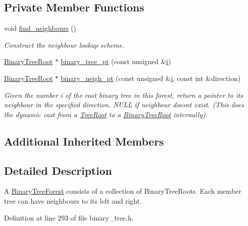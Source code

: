\subsection*{Private Member Functions}
\begin{DoxyCompactItemize}
\item 
void \hyperlink{classoomph_1_1BinaryTreeForest_a01845fafe6ef29f11226bf11e07eec1a}{find\+\_\+neighbours} ()
\begin{DoxyCompactList}\small\item\em Construct the neighbour lookup scheme. \end{DoxyCompactList}\item 
\hyperlink{classoomph_1_1BinaryTreeRoot}{Binary\+Tree\+Root} $\ast$ \hyperlink{classoomph_1_1BinaryTreeForest_a21c3136cc71dc64d68e1799cccf267b0}{binary\+\_\+tree\+\_\+pt} (const unsigned \&\hyperlink{cfortran_8h_adb50e893b86b3e55e751a42eab3cba82}{i})
\item 
\hyperlink{classoomph_1_1BinaryTreeRoot}{Binary\+Tree\+Root} $\ast$ \hyperlink{classoomph_1_1BinaryTreeForest_ab4b0d2442ea99b55620af7126a78f930}{binary\+\_\+neigh\+\_\+pt} (const unsigned \&\hyperlink{cfortran_8h_adb50e893b86b3e55e751a42eab3cba82}{i}, const int \&direction)
\begin{DoxyCompactList}\small\item\em Given the number i of the root binary tree in this forest, return a pointer to its neighbour in the specified direction. N\+U\+LL if neighbour doesn\textquotesingle{}t exist. (This does the dynamic cast from a \hyperlink{classoomph_1_1TreeRoot}{Tree\+Root} to a \hyperlink{classoomph_1_1BinaryTreeRoot}{Binary\+Tree\+Root} internally). \end{DoxyCompactList}\end{DoxyCompactItemize}
\subsection*{Additional Inherited Members}


\subsection{Detailed Description}
A \hyperlink{classoomph_1_1BinaryTreeForest}{Binary\+Tree\+Forest} consists of a collection of Binary\+Tree\+Roots. Each member tree can have neighbours to its left and right. 

Definition at line 293 of file binary\+\_\+tree.\+h.



